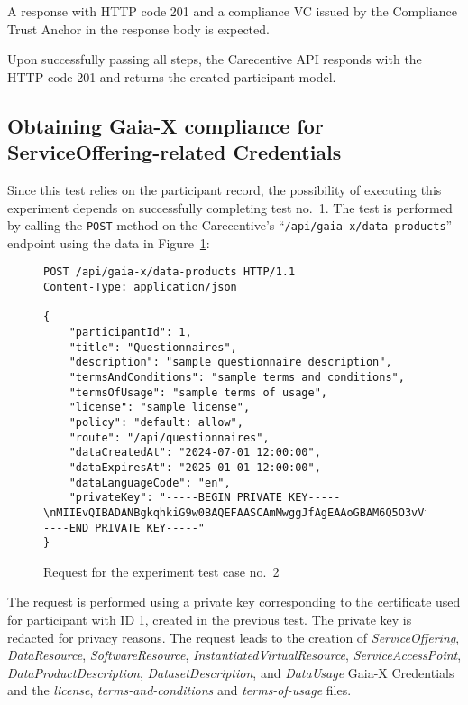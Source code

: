 A response with HTTP code 201 and a compliance VC issued by the Compliance Trust Anchor in the response body is expected.

Upon successfully passing all steps, the Carecentive API responds with the HTTP code 201 and returns the created participant model.

\subsection{Obtaining Gaia-X compliance for ServiceOffering-related Credentials}\label{subsec:service-offering-compliance}

Since this test relies on the participant record, the possibility of executing this experiment depends on successfully completing test no.~1.
The test is performed by calling the \texttt{POST} method on the Carecentive's ``\texttt{/api/gaia-x/data-products}'' endpoint using the data in Figure~\ref{fig:test_case_2}:

\begin{figure}[h]
    \centering
    \begin{verbatim}
POST /api/gaia-x/data-products HTTP/1.1
Content-Type: application/json

{
    "participantId": 1,
	"title": "Questionnaires",
	"description": "sample questionnaire description",
	"termsAndConditions": "sample terms and conditions",
	"termsOfUsage": "sample terms of usage",
	"license": "sample license",
	"policy": "default: allow",
	"route": "/api/questionnaires",
	"dataCreatedAt": "2024-07-01 12:00:00",
	"dataExpiresAt": "2025-01-01 12:00:00",
	"dataLanguageCode": "en",
	"privateKey": "-----BEGIN PRIVATE KEY-----\nMIIEvQIBADANBgkqhkiG9w0BAQEFAASCAmMwggJfAgEAAoGBAM6Q5O3vVfnxk6P7\n...\nYWw+HiFJh9XQpRUtv9PV8L8AqFFfMdsOpT6pgC+aA/WB\n-----END PRIVATE KEY-----"
}
    \end{verbatim}
    \caption{Request for the experiment test case no.~2}\label{fig:test_case_2}
\end{figure}

The request is performed using a private key corresponding to the certificate used for participant with ID 1, created in the previous test.
The private key is redacted for privacy reasons.
The request leads to the creation of \textit{ServiceOffering}, \textit{DataResource}, \textit{SoftwareResource}, \textit{InstantiatedVirtualResource}, \textit{ServiceAccessPoint}, \textit{DataProductDescription}, \textit{DatasetDescription}, and \textit{DataUsage} Gaia-X Credentials and the \textit{license}, \textit{terms-and-conditions} and \textit{terms-of-usage} files.

